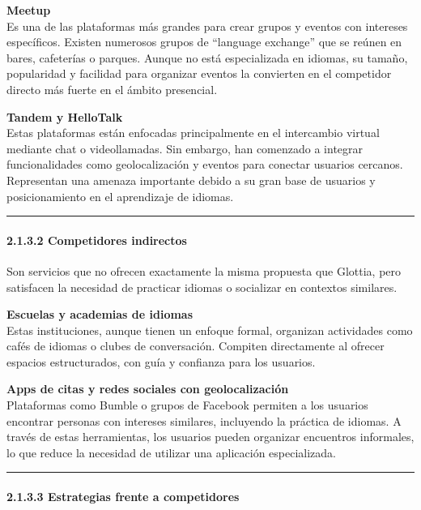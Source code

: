 \textbf{Meetup}\\
Es una de las plataformas más grandes para crear grupos y eventos con
intereses específicos. Existen numerosos grupos de ``language exchange''
que se reúnen en bares, cafeterías o parques. Aunque no está
especializada en idiomas, su tamaño, popularidad y facilidad para
organizar eventos la convierten en el competidor directo más fuerte en
el ámbito presencial.

\textbf{Tandem y HelloTalk}\\
Estas plataformas están enfocadas principalmente en el intercambio
virtual mediante chat o videollamadas. Sin embargo, han comenzado a
integrar funcionalidades como geolocalización y eventos para conectar
usuarios cercanos. Representan una amenaza importante debido a su gran
base de usuarios y posicionamiento en el aprendizaje de idiomas.

\begin{center}\rule{0.5\linewidth}{0.5pt}\end{center}

\paragraph{2.1.3.2 Competidores
indirectos}\label{report__20-cap2-requirements-analysis.md__competidores-indirectos}

Son servicios que no ofrecen exactamente la misma propuesta que Glottia,
pero satisfacen la necesidad de practicar idiomas o socializar en
contextos similares.

\textbf{Escuelas y academias de idiomas}\\
Estas instituciones, aunque tienen un enfoque formal, organizan
actividades como cafés de idiomas o clubes de conversación. Compiten
directamente al ofrecer espacios estructurados, con guía y confianza
para los usuarios.

\textbf{Apps de citas y redes sociales con geolocalización}\\
Plataformas como Bumble o grupos de Facebook permiten a los usuarios
encontrar personas con intereses similares, incluyendo la práctica de
idiomas. A través de estas herramientas, los usuarios pueden organizar
encuentros informales, lo que reduce la necesidad de utilizar una
aplicación especializada.

\begin{center}\rule{0.5\linewidth}{0.5pt}\end{center}

\paragraph{2.1.3.3 Estrategias frente a
competidores}\label{report__20-cap2-requirements-analysis.md__estrategias-frente-a-competidores-1}

